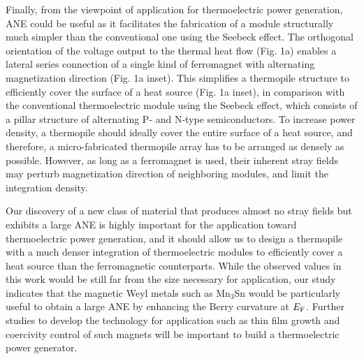 \documentclass[amsmath,amssymb]{nature}
\begin{document}
\color{black}
Finally, from the viewpoint of application for thermoelectric power generation, ANE could be useful as it facilitates the fabrication of a module structurally much simpler than the conventional one using the Seebeck effect\cite{Sakuraba2013}. The orthogonal orientation of the voltage output to the thermal heat flow (Fig. 1a) enables a lateral series connection of a single kind of ferromagnet with alternating magnetization direction (Fig. 1a inset). This simplifies a thermopile structure to efficiently cover the surface of a heat source (Fig. 1a inset), in comparison with the conventional thermoelectric module using the Seebeck effect, which consists of a pillar structure of alternating P- and N-type semiconductors. To increase power density, a thermopile should ideally cover the entire surface of a heat source, and therefore, a micro-fabricated thermopile array has to be arranged as densely as possible. However, as long as a ferromagnet is used, their inherent stray fields may perturb magnetization direction of neighboring modules, and limit the integration density. 

Our discovery of a new class of material that produces almost no stray fields but exhibits a large ANE is highly important for the application toward thermoelectric power generation, and it should allow us to design a thermopile with a much denser integration of thermoelectric modules to efficiently cover a heat source than the ferromagnetic counterparts.  While the observed values in this work would be still far from the size necessary for application, our study indicates that the magnetic Weyl metals such as Mn$_3$Sn would be particularly useful to obtain a large ANE by enhancing the Berry curvature at $E_{\rm F}$. Further studies to develop the technology for application such as thin film growth and coercivity control of such magnets will be important to build a thermoelectric power generator. 
\end{document}
